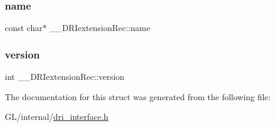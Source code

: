 \subsubsection{\texorpdfstring{name}{name}}
{\footnotesize\ttfamily const char$\ast$ \+\_\+\+\_\+\+D\+R\+Iextension\+Rec\+::name}

\mbox{\label{struct_____d_r_iextension_rec_a6fa021bb0b66dbc662a4397a21ffa198}} 
\subsubsection{\texorpdfstring{version}{version}}
{\footnotesize\ttfamily int \+\_\+\+\_\+\+D\+R\+Iextension\+Rec\+::version}



The documentation for this struct was generated from the following file\+:\begin{DoxyCompactItemize}
\item 
G\+L/internal/\hyperlink{dri__interface_8h}{dri\+\_\+interface.\+h}\end{DoxyCompactItemize}
